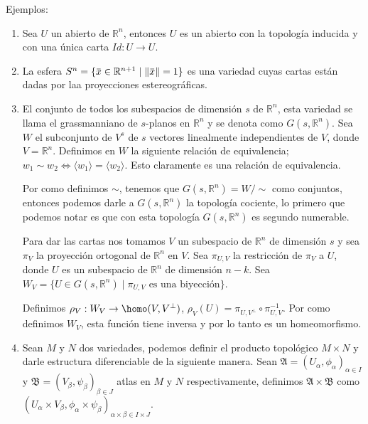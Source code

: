 \documentclass{report}
\theoremstyle{definition}
\newcommand{\overbar}[1]{\mkern 1.5mu\overline{\mkern-1.5mu#1\mkern-1.5mu}\mkern 1.5mu}
\let\hom\homo
\DeclareMathOperator{\hom}{Hom}
\begin{document}
Ejemplos: 
\begin{enumerate}

\item Sea $U$ un abierto de $\mathbb{R}^n$, entonces $U$ es un abierto con la topolog\'ia inducida y con una \'unica carta $Id: U \to U$.

\item La esfera $S^n = \{ \overbar{x} \in \mathbb{R}^{n + 1} \mid \Vert \overbar{x} \Vert = 1 \}$ es una variedad cuyas cartas est\'an dadas por laa proyecciones estereogr\'aficas.

\item El conjunto de todos los subespacios de dimensi\'on $s$ de $\mathbb{R}^n$, esta variedad se llama el grassmanniano de $s$-planos en $\mathbb{R}^n$ y se denota como $G(s, \mathbb{R}^n)$. Sea $W$ el subconjunto de $V^s$ de $s$ vectores linealmente independientes de $V$, donde $V= \mathbb{R}^n$. Definimos en $W$ la siguiente relaci\'on de equivalencia; $w_1 \sim w_2 \iff \langle w_1 \rangle = \langle w_2 \rangle$. Esto claramente es una relaci\'on de equivalencia. 

Por como definimos $\sim$, tenemos que $G(s, \mathbb{R}^n) = W/\sim$ como conjuntos, entonces podemos darle a $G(s, \mathbb{R}^n)$ la topolog\'ia cociente, lo primero que podemos notar es que con esta topolog\'ia $G(s, \mathbb{R}^n)$ es segundo numerable.

Para dar las cartas nos tomamos $V$ un subespacio de $\mathbb{R}^n$ de dimensi\'on $s$ y sea $\pi_V$ la proyecci\'on ortogonal de $\mathbb{R}^n$ en $V$. Sea $\pi_{U , V}$ la restricci\'on de $\pi_V$ a $U$, donde $U$ es un subespacio de $\mathbb{R}^n$ de dimensi\'on $n-k$. Sea $W_V = \{ U \in G(s, \mathbb{R}^n) \mid \pi_{U, V} \text{ es una biyecci\'on} \}$.

Definimos $\rho_V: W_V \to \hom (V, V^\perp )$, $\rho_V (U) = \pi_{U , V^\perp } \circ \pi_{U, V}^{-1}$. Por como definimos $W_V$, esta funci\'on tiene inversa y por lo tanto es un homeomorfismo.

\item Sean $M$ y $N$ dos variedades, podemos definir el producto topol\'ogico $M \times N$ y darle estructura diferenciable de la siguiente manera. Sean $\mathfrak{A} = (U_\alpha, \phi_\alpha)_{\alpha \in I}$ y $\mathfrak{B} = (V_\beta , \psi_\beta)_{\beta \in J}$ atlas en $M$ y $N$ respectivamente, definimos $\mathfrak{A} \times \mathfrak{B}$ como $(U_\alpha \times V_\beta , \phi_\alpha \times \psi_\beta)_{\alpha \times \beta \in I \times J}$.



\end{enumerate}
\end{document}
